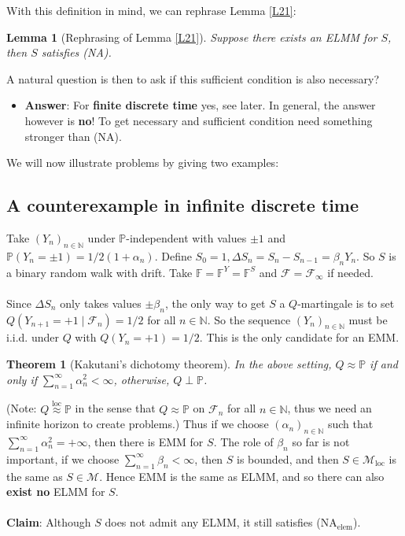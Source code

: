 \documentclass[12pt,a4paper, twoside]{article}
\newtheorem{lem}{Lemma}[section]
\newtheorem{thm}{Theorem}[section]
\theoremstyle{definition}
\newcommand{\PP}{\mathbb{P}} %
\begin{document}
With this definition in mind, we can rephrase Lemma \ref{L21}:
\begin{lem}[Rephrasing of Lemma \ref{L21}] Suppose there exists an ELMM for $S$, then $S$ satisfies (NA). 
\end{lem}
A natural question is then to ask if this sufficient condition is also necessary?
\begin{itemize}
\item \textbf{Answer}: For \textbf{finite discrete time} yes, see later. In general, the answer however is \textbf{no}! To get necessary and sufficient condition need something stronger than (NA). 
\end{itemize}
We will now illustrate problems by giving two examples:
\subsection{A counterexample in infinite discrete time}
Take $(Y_n)_{n \in \mathbb{N}}$ under $\PP$-independent with values $\pm 1$ and $\PP(Y_n= \pm 1)= 1/2(1+ \alpha_n)$. Define $S_0=1, \Delta S_n= S_n-S_{n-1}= \beta_n Y_n$. So $S$ is a binary random walk with drift. Take $\mathbb{F}= \mathbb{F}^Y= \mathbb{F}^S$ and $\mathcal{F}= \mathcal{F}_\infty$ if needed. \\
\\
Since $\Delta S_n$ only takes values $\pm \beta_n$, the only way to get $S$ a $Q$-martingale is to set $Q(Y_{n+1}= +1 \mid \mathcal{F}_n)= 1/2$ for all $n \in \mathbb{N}$. So the sequence $(Y_n)_{n \in \mathbb{N}}$ must be i.i.d. under $Q$ with $Q(Y_n=+1)=1/2$. This is the only candidate for an EMM. 
\begin{thm}[Kakutani's dichotomy theorem] In the above setting, $Q \approx \PP$ if and only if $\sum_{n=1}^\infty \alpha_n^2 < \infty$, otherwise, $Q \perp \PP$. 
\end{thm}
(Note: $Q \overset{\text{loc}}\approx \PP$ in the sense that $Q \approx \PP$ on $\mathcal{F}_n$ for all $n \in \mathbb{N}$, thus we need an infinite horizon to create problems.)
\newpage
Thus if we choose $(\alpha_n)_{n \in \mathbb{N}}$ such that $\sum_{n=1}^\infty \alpha_n^2 = + \infty$, then there is EMM for $S$. The role of $\beta_n$ so far is not important, if we choose $\sum_{n=1}^\infty \beta_n < \infty$, then $S$ is bounded, and then $S \in \mathcal{M}_{\text{loc}}$ is the same as $S \in \mathcal{M}$. Hence EMM is the same as ELMM, and so there can also \textbf{exist no} ELMM for $S$. \\
\\
\textbf{Claim}: Although $S$ does not admit any ELMM, it still satisfies (NA$_\text{elem}$). 
\end{document}
